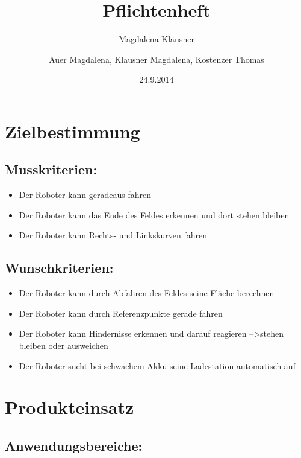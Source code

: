 \documentclass[12pt,a4paper]{article}
\author{Magdalena Klausner}
\newcommand{\changefont}[3]{
\fontfamily{#1}
\fontseries{#2}
\fontshape{#3}
\selectfont}
\begin{document}
\changefont{cmss}{m}{n}

\title{ Pflichtenheft}
\author{Auer Magdalena, Klausner Magdalena, Kostenzer Thomas }
\date{24.9.2014}
\centering{}

\newpage
\tableofcontents
\newpage


\section{ Zielbestimmung}
\subsection{ Musskriterien:}

\begin{itemize}
\item Der Roboter kann geradeaus fahren 
\item Der Roboter kann das Ende des Feldes erkennen und dort stehen bleiben
\item Der Roboter kann Rechts- und Linkskurven fahren
\end{itemize}


\subsection{Wunschkriterien:}
\begin{itemize}
\item Der Roboter kann durch Abfahren des Feldes seine Fläche berechnen 
\item Der Roboter kann durch Referenzpunkte gerade fahren
\item Der Roboter kann Hindernisse erkennen und darauf reagieren  --\textgreater stehen bleiben oder ausweichen
\item Der Roboter sucht bei schwachem Akku seine Ladestation automatisch auf 
\end{itemize}


\section{ Produkteinsatz}

\subsection{Anwendungsbereiche:}
\end{document}
